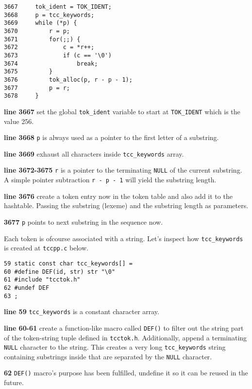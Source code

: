 \begin{verbatim}
3667     tok_ident = TOK_IDENT;
3668     p = tcc_keywords;
3669     while (*p) {
3670         r = p;
3671         for(;;) {
3672             c = *r++;
3673             if (c == '\0')
3674                 break;
3675         }
3676         tok_alloc(p, r - p - 1);
3677         p = r;
3678     }
\end{verbatim}

\begin{tcc_desc}
\textbf{line 3667} set the global \verb|tok_ident| variable to start at \verb|TOK_IDENT| which is the value 256.

\textbf{line 3668} \verb|p| is always used as a pointer to the first letter of a substring.

\textbf{line 3669} exhaust all characters inside \verb|tcc_keywords| array.

\textbf{line 3672-3675} \verb|r| is a pointer to the terminating \verb|NULL| of the current substring. A simple pointer subtraction \verb|r - p - 1| will yield the substring length.

\textbf{line 3676} create a token entry now in the token table and also add it to the hashtable. Passing the substring (lexeme) and the substring length as parameters.

\textbf{3677} \verb|p| points to next substring in the sequence now.

\end{tcc_desc}

Each token is ofcourse associated with a string. Let's inspect how \verb|tcc_keywords| is created at \verb|tccpp.c| below.

\begin{verbatim}
59 static const char tcc_keywords[] = 
60 #define DEF(id, str) str "\0"
61 #include "tcctok.h"
62 #undef DEF
63 ;
\end{verbatim}
\begin{tcc_desc}
\textbf{line 59} \verb|tcc_keywords| is a constant character array.

\textbf{line 60-61} create a function-like macro called \verb|DEF()| to filter out the string part of the token-string tuple defined in \verb|tcctok.h|. Additionally, append a terminating \verb|NULL| character to the string. This creates a very long \verb|tcc_keywords| string containing substrings inside that are separated by the \verb|NULL| character.

\textbf{62} \verb|DEF()| macro's purpose has been fulfilled, undefine it so it can be reused in the future.
\end{tcc_desc}


